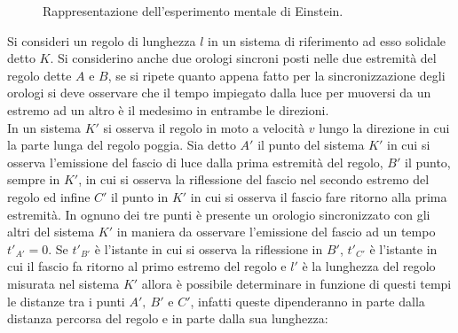 \begin{figure}[H]
    \centering
    \caption{Rappresentazione dell'esperimento mentale di Einstein.}
    \label{fig:esperMentale}
\end{figure}
Si consideri un regolo di lunghezza $l$ in un sistema di riferimento ad esso solidale detto $K$. Si considerino anche due orologi sincroni posti nelle due estremità del regolo dette $A$ e $B$, se si ripete quanto appena fatto per la sincronizzazione degli orologi si deve osservare che il tempo impiegato dalla luce per muoversi da un estremo ad un altro è il medesimo in entrambe le direzioni.\\ In un sistema $K'$ si osserva il regolo in moto a velocità $v$ lungo la direzione in cui la parte lunga del regolo poggia. Sia detto $A'$ il punto del sistema $K'$ in cui si osserva l'emissione del fascio di luce dalla prima estremità del regolo, $B'$ il punto, sempre in $K'$, in cui si osserva la riflessione del fascio nel secondo estremo del regolo ed infine $C'$ il punto in $K'$ in cui si osserva il fascio fare ritorno alla prima estremità. In ognuno dei tre punti è presente un orologio sincronizzato con gli altri del sistema $K'$ in maniera da osservare l'emissione del fascio ad un tempo $t'_{A'}=0$. Se $t'_{B'}$ è l'istante in cui si osserva la riflessione in $B'$, $t'_{C'}$ è l'istante in cui il fascio fa ritorno al primo estremo del regolo e $l'$ è la lunghezza del regolo misurata nel sistema $K'$ allora è possibile determinare in funzione di questi tempi le distanze tra i punti $A',\ B'$ e $C'$, infatti queste dipenderanno in parte dalla distanza percorsa del regolo e in parte dalla sua lunghezza:
